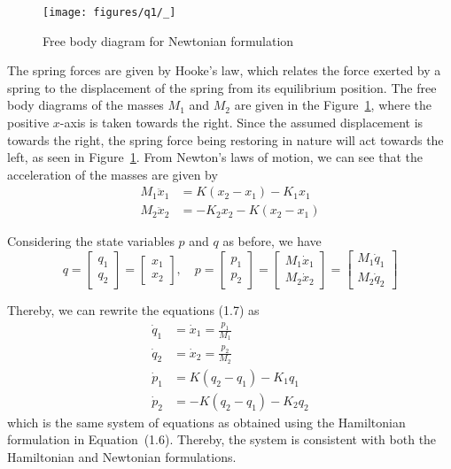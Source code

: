 \begin{figure}[htb]
    \centering
    \texttt{[image: figures/q1/\_]}
    \caption{
        Free body diagram for Newtonian formulation
    }\label{fig:q1-newtonian}
\end{figure}

The spring forces are given by Hooke's law, which relates the force exerted by a spring to the displacement of the spring from its equilibrium position.
The free body diagrams of the masses \(M_1\) and \(M_2\) are given in the Figure~\ref{fig:q1-newtonian}, where the positive \(x\)-axis is taken towards the right.
Since the assumed displacement is towards the right, the spring force being restoring in nature will act towards the left, as seen in Figure~\ref{fig:q1-newtonian}.
From Newton's laws of motion, we can see that the acceleration of the masses are given by
\[
    \begin{aligned}
        M_1 \ddot x_1 & = K (x_2 - x_1) - K_1 x_1  \\
        M_2 \ddot x_2 & = -K_2 x_2 - K (x_2 - x_1)
    \end{aligned}
    \tag{1.7}
\]

Considering the state variables \(p\) and \(q\) as before, we have
\[
    q = \begin{bmatrix} q_1 \\ q_2 \end{bmatrix} = \begin{bmatrix} x_1 \\ x_2 \end{bmatrix},
    \quad
    p = \begin{bmatrix} p_1 \\ p_2 \end{bmatrix} = \begin{bmatrix} M_1 \dot x_1 \\ M_2 \dot x_2 \end{bmatrix} = \begin{bmatrix} M_1 \dot q_1 \\ M_2 \dot q_2 \end{bmatrix}
\]

Thereby, we can rewrite the equations (1.7) as
\[
    \begin{aligned}
        \dot q_1 & = \dot x_1 = \frac{p_1}{M_1} \\
        \dot q_2 & = \dot x_2 = \frac{p_2}{M_2} \\
        \dot p_1 & = K (q_2 - q_1) - K_1 q_1    \\
        \dot p_2 & = -K (q_2 - q_1) - K_2 q_2
    \end{aligned}
\]
which is the same system of equations as obtained using the Hamiltonian formulation in Equation~(1.6).
Thereby, the system is consistent with both the Hamiltonian and Newtonian formulations.
